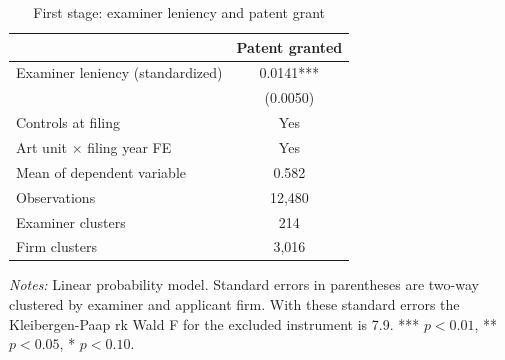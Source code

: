\documentclass[11pt]{article}
\begin{document}
\begin{table}[htbp]
\centering
\begin{threeparttable}
\caption{First stage: examiner leniency and patent grant}
\label{tab:fs}
\small
\begin{tabular}{lc}
\toprule
 & Patent granted \\
\midrule
Examiner leniency (standardized) & 0.0141*** \\
 & (0.0050) \\[0.5em]
Controls at filing & Yes \\
Art unit $\times$ filing year FE & Yes \\
Mean of dependent variable & 0.582 \\
Observations & 12,480 \\
Examiner clusters & 214 \\
Firm clusters & 3,016 \\
\bottomrule
\end{tabular}
\begin{tablenotes}\footnotesize
\item \textit{Notes:} Linear probability model. Standard errors in parentheses are two-way clustered by examiner and applicant firm. With these standard errors the Kleibergen-Paap rk Wald F for the excluded instrument is 7.9. *** $p<0.01$, ** $p<0.05$, * $p<0.10$.
\end{tablenotes}
\end{threeparttable}
\end{table}
\end{document}

